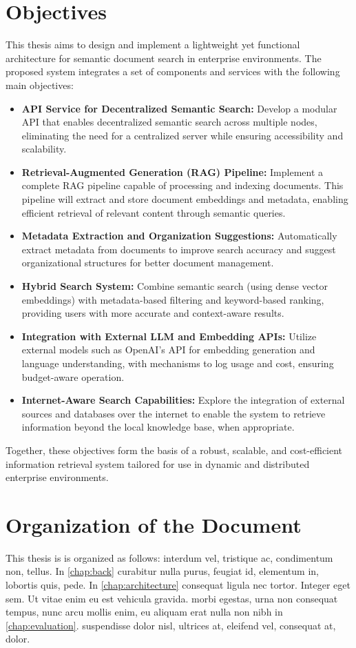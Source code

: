 \section{Objectives}
This thesis aims to design and implement a lightweight yet functional architecture for semantic document search in enterprise environments. The proposed system integrates a set of components and services with the following main objectives:
\begin{itemize}
\item \textbf{API Service for Decentralized Semantic Search:} Develop a modular API that enables decentralized semantic search across multiple nodes, eliminating the need for a centralized server while ensuring accessibility and scalability.
\item \textbf{Retrieval-Augmented Generation (RAG) Pipeline:} Implement a complete RAG pipeline capable of processing and indexing documents. This pipeline will extract and store document embeddings and metadata, enabling efficient retrieval of relevant content through semantic queries.
\item \textbf{Metadata Extraction and Organization Suggestions:} Automatically extract metadata from documents to improve search accuracy and suggest organizational structures for better document management.
\item \textbf{Hybrid Search System:} Combine semantic search (using dense vector embeddings) with metadata-based filtering and keyword-based ranking, providing users with more accurate and context-aware results.
\item \textbf{Integration with External LLM and Embedding APIs:} Utilize external models such as OpenAI’s API for embedding generation and language understanding, with mechanisms to log usage and cost, ensuring budget-aware operation.
\item \textbf{Internet-Aware Search Capabilities:} Explore the integration of external sources and databases over the internet to enable the system to retrieve information beyond the local knowledge base, when appropriate.
\end{itemize}
Together, these objectives form the basis of a robust, scalable, and cost-efficient information retrieval system tailored for use in dynamic and distributed enterprise environments.
\section{Organization of the Document}
This thesis is is organized as follows:  interdum vel, tristique ac, condimentum non, tellus. 
In \cref{chap:back} curabitur nulla purus, feugiat id, elementum in, lobortis quis, pede.
In \cref{chap:architecture} consequat ligula nec tortor. Integer eget sem. Ut vitae enim eu est vehicula gravida.
 morbi egestas, urna non consequat tempus, nunc arcu mollis enim, eu aliquam erat nulla non nibh in \cref{chap:evaluation}.
 suspendisse dolor nisl, ultrices at, eleifend vel, consequat at, dolor.